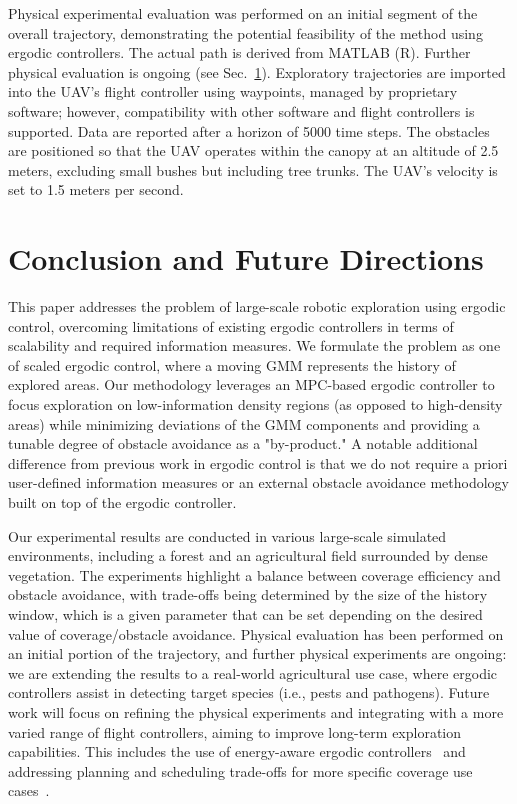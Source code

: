 \documentclass[letterpaper,10pt,conference,twoside]{IEEEtran}
\theoremstyle{definition}
\begin{document}
Physical experimental evaluation was performed on an initial segment of the overall trajectory, demonstrating the potential feasibility of the method using ergodic controllers. The actual path is derived from MATLAB (R). Further physical evaluation is ongoing (see Sec.~\ref{sec:conc}). Exploratory trajectories are imported into the UAV's flight controller using waypoints, managed by proprietary software; however, compatibility with other software and flight controllers is supported. Data are reported after a horizon of 5000 time steps. The obstacles are positioned so that the UAV operates within the canopy at an altitude of 2.5 meters, excluding small bushes but including tree trunks. The UAV's velocity is set to 1.5 meters per second.

\section{Conclusion and Future Directions}\label{sec:conc}
\noindent
This paper addresses the problem of large-scale robotic exploration using ergodic control, overcoming limitations of existing ergodic controllers in terms of scalability and required information measures. We formulate the problem as one of scaled ergodic control, where a moving GMM represents the history of explored areas. Our methodology leverages an MPC-based ergodic controller to focus exploration on low-information density regions (as opposed to high-density areas) while minimizing deviations of the GMM components and providing a tunable degree of obstacle avoidance as a "by-product." A notable  additional difference from previous work in ergodic control is that we do not require a priori user-defined information measures or an external obstacle avoidance methodology built on top of the ergodic controller.

Our experimental results are conducted in various large-scale simulated environments, including a forest and an agricultural field surrounded by dense vegetation. The experiments highlight a balance between coverage efficiency and obstacle avoidance, with trade-offs being determined by the size of the history window, which is a given parameter that can be set depending on the desired value of coverage/obstacle avoidance. Physical evaluation has been performed on an initial portion of the trajectory, and further physical experiments are ongoing: we are extending the results to a real-world agricultural use case, where ergodic controllers assist in detecting target species (i.e., pests and pathogens). Future work will focus on refining the physical experiments and integrating with a more varied range of flight controllers, aiming to improve long-term exploration capabilities. This includes the use of energy-aware ergodic controllers~\cite{seewald2024energy,naveed2024eclares} and addressing planning and scheduling trade-offs for more specific coverage use cases~\cite{seewald2022energy,seewaldphdthesis}.




{\small
 

}
\end{document}
